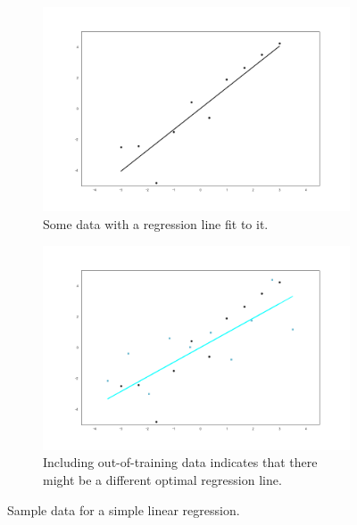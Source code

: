 \documentclass[11pt, a4paper]{article}
\begin{document}
\begin{figure}[h]
	\centering
    \begin{subfigure}[b]{0.49\linewidth}
        \includegraphics[width=\linewidth]{lina.png}%
        \caption{Some data with a regression line fit to it.\newline}
        \label{fig:lina}
    \end{subfigure}
    \begin{subfigure}[b]{0.49\linewidth}
        \includegraphics[width=\linewidth]{linb.png}%
        \caption{Including out-of-training data indicates that there might be a different optimal regression line.}
        \label{fig:linb}
    \end{subfigure}
    \label{fig:slr}
    \caption{Sample data for a simple linear regression.}
\end{figure}
\\
\end{document}
